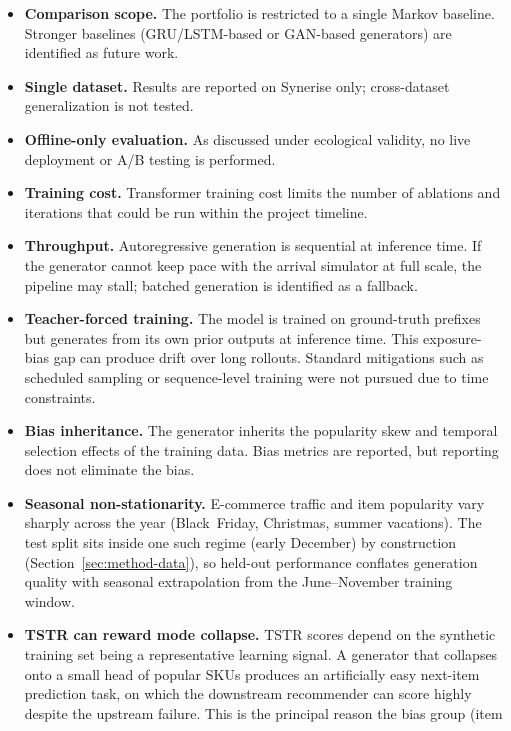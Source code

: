 \documentclass[sigconf,nonacm]{acmart}
\begin{document}
\begin{itemize}[leftmargin=*]
  \item \textbf{Comparison scope.} The portfolio is restricted to a
    single Markov baseline. Stronger baselines (GRU/LSTM-based or
    GAN-based generators) are identified as future work.
  \item \textbf{Single dataset.} Results are reported on Synerise only;
    cross-dataset generalization is not tested.
  \item \textbf{Offline-only evaluation.} As discussed under ecological
    validity, no live deployment or A/B testing is performed.
  \item \textbf{Training cost.} Transformer training cost limits the
    number of ablations and iterations that could be run within the
    project timeline.
  \item \textbf{Throughput.} Autoregressive generation is sequential at
    inference time. If the generator cannot keep pace with the arrival
    simulator at full scale, the pipeline may stall; batched generation
    is identified as a fallback.
  \item \textbf{Teacher-forced training.} The model is trained on
    ground-truth prefixes but generates from its own prior outputs at
    inference time. This exposure-bias gap can produce drift over long
    rollouts. Standard mitigations such as scheduled sampling or
    sequence-level training were not pursued due to time constraints.
  \item \textbf{Bias inheritance.} The generator inherits the
    popularity skew and temporal selection effects of the training
    data. Bias metrics are reported, but reporting does not eliminate
    the bias.
  \item \textbf{Seasonal non-stationarity.} E-commerce traffic and
    item popularity vary sharply across the year (Black~Friday,
    Christmas, summer vacations). The test split sits inside one such
    regime (early December) by construction
    (Section~\ref{sec:method-data}), so held-out performance
    conflates generation quality with seasonal extrapolation from the
    June--November training window.
  \item \textbf{TSTR can reward mode collapse.} TSTR scores depend on
    the synthetic training set being a representative learning signal.
    A generator that collapses onto a small head of popular SKUs
    produces an artificially easy next-item prediction task, on which
    the downstream recommender can score highly despite the upstream
    failure. This is the principal reason the bias group (item

\end{itemize}
\end{document}
